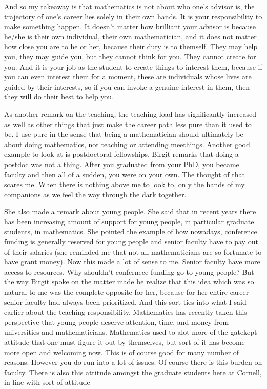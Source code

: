 \documentclass[12pt]{article}
\begin{document}
\hfill

And so my takeaway is that mathematics is not about who one's advisor is, the trajectory of one's career lies solely in their own hands. It is your responsibility to make something happen.
It doesn't matter how brilliant your advisor is because he/she is their own individual, their own mathematician, and it does not matter how close you are to he or her, because their duty is to themself.
They may help you, they may guide you, but they cannot think for you. They cannot create for you. And it is your job as the student to create things to interest them, because if you
can even interest them for a moment, these are individuals whose lives are guided by their interests, so if you can invoke a genuine interest in them, then they will do their best to help you.

\hfill

As another remark on the teaching, the teaching load has significantly increased as well as other things that just make the career path less pure 
than it used to be. I use pure in the sense that being a mathematician should ultimately be about doing mathematics, not teaching or attending meethings.
Another good example to look at is postdoctoral fellowships. Birgit remarks that doing a postdoc was not a thing. After you graduated from your PhD,
you became faculty and then all of a sudden, you were on your own. The thought of that scares me. When there is nothing above me to look to, only 
the hands of my companions as we feel the way through the dark together.


\hfill

She also made a remark about young people. She said that in recent years there has been increasing amount of support for young people, in particular graduate students, in mathematics. She pointed the example
of how nowadays, conference funding is generally reserved for young people and senior faculty have to pay out of their salaries (she reminded me that not all mathematicians are so fortunate to have grant money).
Now this made a lot of sense to me. Senior faculty have more access to resources. Why shouldn't confernece funding go to young people? But the way Birgit spoke on the matter made be realize that this idea which
was so natural to me was the complete opposite for her, because for her entire career senior faculty had always been prioritized. And this sort ties into what I said earlier about the teaching responsibility.
Mathematics has recently taken this perspective that young people deserve attention, time, and money from universities and mathematicians. 
Mathematics used to alot more of the gatekept attitude that one must figure it out by themselves, but sort of it has become more open and welcoming now.
This is of course good for many number of reasons. However you do run into a lot of issues. Of course there is this burden on faculty. 
There is also this attitude amongst the graduate students here at Cornell, in line with sort of attitude
\end{document}
